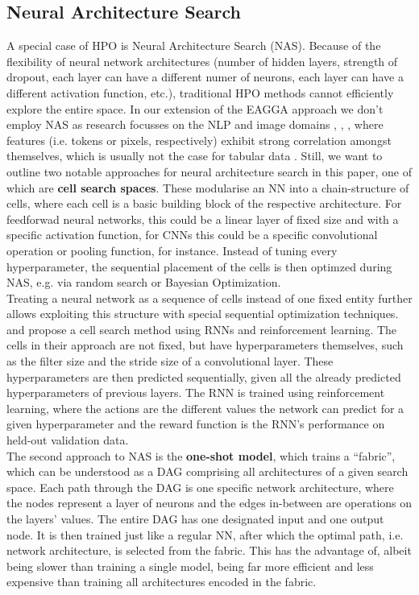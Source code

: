 \documentclass[twoside,11pt]{article}
\begin{document}
\subsection{Neural Architecture Search}
A special case of HPO is Neural Architecture Search (NAS). Because of the flexibility of neural network architectures (number of hidden layers, strength of dropout,
each layer can have a different numer of neurons, each layer can have a different activation function, etc.), traditional HPO methods cannot efficiently explore the
entire space.
In our extension of the EAGGA approach we don't employ NAS as research focusses on the NLP and
image domains \citep{baker2017designingneuralnetworkarchitectures},  \citep{10.5555/3504035.3504375},  \citep{10.1145/3071178.3071229},
where features (i.e. tokens or pixels, respectively) exhibit strong correlation amongst themselves, which is usually not the case for tabular data \citep[p. 7499]{Borisov_2024}.
Still, we want to outline two notable approaches for neural architecture search in this paper, one of which are \textbf{cell search spaces}.
These modularise an NN into a chain-structure of cells, where each cell is a basic building block of the respective architecture. For feedforwad neural networks,
this could be a linear layer of fixed size and with a specific activation function,
for CNNs this could be a specific convolutional operation or pooling function, for instance.
Instead of tuning every hyperparameter, the sequential placement of the cells is then optimzed during NAS, e.g. via random search or Bayesian
Optimization. \citep[p. 67]{elsken_neural_2019}
\\
Treating a neural network as a sequence of cells instead of one fixed entity further allows exploiting this structure with special sequential optimization techniques.
\citet[p. 3]{zoph2017neuralarchitecturesearchreinforcement} and \citet[pp. 2-4]{Zoph_2018_CVPR} propose a cell search method using RNNs and reinforcement learning.
The cells in their approach are not fixed, but have hyperparameters themselves, such as the filter size and the stride size of a convolutional layer.
These hyperparameters are then predicted sequentially, given all the already predicted hyperparameters of previous layers. The RNN is trained using reinforcement
learning, where the actions are the different values the network can predict for a given hyperparameter and the reward function is the RNN's performance on held-out
validation data.
\\
The second approach to NAS is the \textbf{one-shot model}, which trains a ``fabric'', which can be understood as a DAG comprising all architectures of a given
search space. Each path through the DAG is one specific network architecture, where the nodes represent a layer of neurons and the edges in-between are operations
on the layers' values. The entire DAG has one designated input and one output node.
It is then trained just like a regular NN, after which the optimal path, i.e. network architecture, is selected from the fabric.
This has the advantage of, albeit being slower than training a single model, being far more efficient and less expensive than training all architectures encoded
in the fabric. \citep[pp. 1-2, p. 8]{saxena2017convolutionalneuralfabrics}
\end{document}

